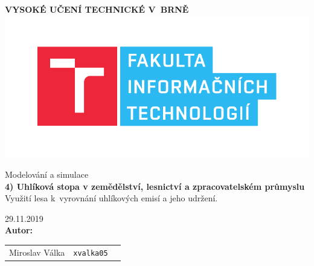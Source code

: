 \begin{titlepage}
    \centering 
    {\fontsize{25pt}{20pt}\bfseries
    VYSOKÉ UČENÍ TECHNICKÉ V~BRNĚ
    }
    \includegraphics[scale=0.7]{./assets/fit-logo.pdf}
    \vspace{25pt}

    {\Large Modelování a simulace\\}
    \vspace{4pt}
    {\LARGE \bfseries 4) Uhlíková stopa v zemědělství, lesnictví a zpracovatelském průmyslu \\}
    \vspace{6pt}
    {\LARGE Využití lesa k~vyrovnání uhlíkových emisí a jeho udržení.}

    \vspace{180pt}
    {\Large 29.11.2019}\\
    \vspace{12pt}
    {\Large \bfseries Autor:\\}
    \vspace{12pt}

    \LARGE{
    \begin{tabular}{ l c r }
        Miroslav Válka & \texttt{xvalka05} \\
    \end{tabular}\\
    }
\end{titlepage}